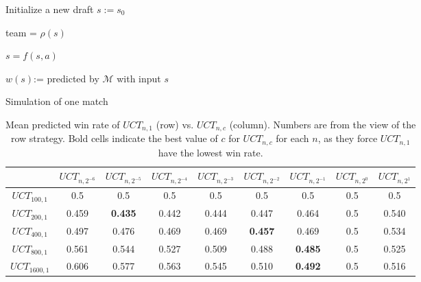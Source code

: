\begin{algorithm}
    \BlankLine
    Initialize a new draft $s:= s_{0}$ 
    \BlankLine
     {
    team = $\rho(s)$
    
    
    
    $s = f(s,a)$
    }
    
    $w(s)$:= predicted by $\mathcal{M}$ with input $s$
    \caption{Simulation of one match}
    \label{alg:sim_match}
\end{algorithm}

\begin{table}
  \caption{Mean predicted win rate of $UCT_{n, 1}$ (row) vs. $UCT_{n, c}$ (column). Numbers are from the view of the row strategy. Bold cells indicate the best value of $c$ for $UCT_{n,c}$ for each $n$, as they force $UCT_{n,1}$ have the lowest win rate.}
  \label{tab:param_set}
  \centering
  \begin{tabular}{ccccccccc}
    \toprule
      & $UCT_{n,2^{-6}}$ & $UCT_{n, 2^{-5}}$ & $UCT_{n, 2^{-4}}$ & $UCT_{n, 2^{-3}}$ & $UCT_{n, 2^{-2}}$ & $UCT_{n, 2^{-1}}$ & $UCT_{n, 2^0}$ & $UCT_{n, 2^1}$\\
    \midrule
    $UCT_{100, 1}$ & 0.5 & 0.5 & 0.5 & 0.5 & 0.5 & 0.5 & 0.5 & 0.5\\
    $UCT_{200, 1}$ & 0.459 & \textbf{0.435} & 0.442 & 0.444 & 0.447 & 0.464 & 0.5 & 0.540 \\
    $UCT_{400, 1}$ & 0.497 & 0.476 & 0.469 & 0.469 & \textbf{0.457} & 0.469 & 0.5 & 0.534 \\
    $UCT_{800, 1}$ & 0.561 & 0.544 & 0.527 & 0.509 & 0.488 & \textbf{0.485} & 0.5 & 0.525 \\
    $UCT_{1600, 1}$ & 0.606 & 0.577 & 0.563 & 0.545 & 0.510 & \textbf{0.492} & 0.5 & 0.516 \\
  \bottomrule
\end{tabular}
\end{table}


